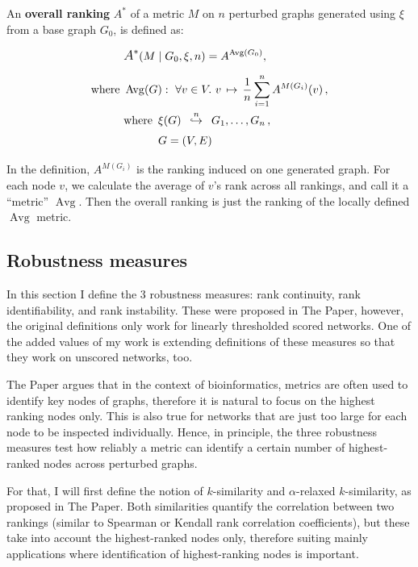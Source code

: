 \begin{definition}
    \label{def:overall_ranking}
    An \textbf{overall ranking} $A^*$ of a metric $M$ on $n$ perturbed graphs generated using $\xi$ from a base graph $G_0$, is defined as:

    \begin{align*}
        &\mathlarger{A^*}\!\left( M \mid G_0, \xi, n \right) = A^{\operatorname{Avg}(G_0)} ,\\[5pt]
        \text{where}~&\operatorname{Avg}(G) :\ \forall v \in V.\ v \,\mapsto\, \frac{1}{n} \sum_{i=1}^n A^{M(G_i)}(v)\, , \\
        &\begin{aligned}
             \text{where}~\,&\xi(G) \generates{n} G_1, \dots, G_n\,, \\
             & G = (V, E)
        \end{aligned}
    \end{align*}
\end{definition}

In the definition, $A^{M(G_i)}$ is the ranking induced on one generated graph.
For each node $v$, we calculate the average of $v$'s rank across all rankings, and call it a ``metric'' $\operatorname{Avg}$.
Then the overall ranking is just the ranking of the locally defined $\operatorname{Avg}$ metric.

\subsection{Robustness measures}\label{sec:robustness_measures}

In this section I define the 3 robustness measures: rank continuity, rank identifiability, and rank instability.
These were proposed in The Paper, however, the original definitions only work for linearly thresholded scored networks.
One of the added values of my work is extending definitions of these measures so that they work on unscored networks, too.

The Paper argues that in the context of bioinformatics, metrics are often used to identify key nodes of graphs, therefore it is natural to focus on the highest ranking nodes only.
This is also true for networks that are just too large for each node to be inspected individually.
Hence, in principle, the three robustness measures test how reliably a metric can identify a certain number of highest-ranked nodes across perturbed graphs.

For that, I will first define the notion of $k$-similarity and $\alpha$-relaxed $k$-similarity, as proposed in The Paper.
Both similarities quantify the correlation between two rankings (similar to Spearman or Kendall rank correlation coefficients), but these take into account the highest-ranked nodes only, therefore suiting mainly applications where identification of highest-ranking nodes is important.

